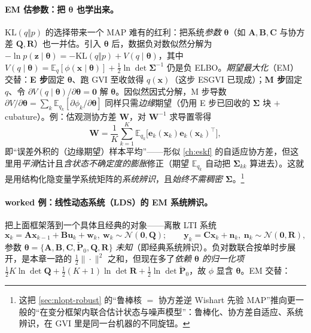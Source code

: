 \paragraph{EM 估参数：把 $\boldsymbol{\theta}$ 也学出来。}
$\mathrm{KL}(q\Vert p)$ 的选择带来一个 MAP 难有的红利：把系统\emph{参数} $\boldsymbol{\theta}$（如 $\mathbf{A},\mathbf{B},\mathbf{C}$ 与协方差 $\mathbf{Q},\mathbf{R}$）也一并估。引入 $\boldsymbol{\theta}$ 后，数据负对数似然分解为 $-\ln p(\mathbf{z}\mid\boldsymbol{\theta})=-\mathrm{KL}(q\Vert p)+V(q\mid\boldsymbol{\theta})$，其中 $V(q\mid\boldsymbol{\theta})=\mathbb{E}_q[\phi(\mathbf{x}\mid\boldsymbol{\theta})]+\tfrac12\ln\det\boldsymbol{\Sigma}^{-1}$ 仍是负 ELBO。\emph{期望最大化}（EM）交替：\textbf{E 步}固定 $\boldsymbol{\theta}$、跑 GVI 至收敛得 $q(\mathbf{x})$（这步 ESGVI 已现成）；\textbf{M 步}固定 $q$、令 $\partial V(q\mid\boldsymbol{\theta})/\partial\boldsymbol{\theta}=\mathbf{0}$ 解 $\boldsymbol{\theta}$。因似然因式分解，M 步导数 $\partial V/\partial\boldsymbol{\theta}=\sum_k\mathbb{E}_{q_k}[\partial\phi_k/\partial\boldsymbol{\theta}]$ 同样只需\emph{边缘}期望（仍用 E 步已回收的 $\boldsymbol{\Sigma}$ 块 $+$ cubature）。例：估观测协方差 $\mathbf{W}$，对 $\mathbf{W}^{-1}$ 求导置零得
\begin{equation}
  \mathbf{W}=\frac1K\sum_{k=1}^{K}\mathbb{E}_{q_k}\!\big[\mathbf{e}_k(\mathbf{x}_k)\mathbf{e}_k(\mathbf{x}_k)^\top\big],
  \label{eq:gvi-em-W}
\end{equation}
即“误差外积的（边缘期望）样本平均”——形似 \cref{ch:eskf} 的自适应协方差，但这里用\emph{平滑}估计且\emph{含状态不确定度的膨胀}修正（期望 $\mathbb{E}_{q_k}$ 自动把 $\boldsymbol{\Sigma}_{kk}$ 算进去）。这就是用结构化隐变量学系统矩阵的\emph{系统辨识}，且\emph{始终不需稠密 $\boldsymbol{\Sigma}$}。\footnote{这把 \cref{sec:nlopt-robust} 的“鲁棒核 $=$ 协方差逆 Wishart 先验 MAP”推向更一般的“在变分框架内联合估计状态与噪声模型”：鲁棒化、协方差自适应、系统辨识，在 GVI 里是同一台机器的不同旋钮。}

\paragraph{worked 例：线性动态系统（LDS）的 EM 系统辨识。}\cite{barfoot2024state}
把上面框架落到一个具体且经典的对象——离散 LTI 系统
\begin{equation}
  \mathbf{x}_k=\mathbf{A}\mathbf{x}_{k-1}+\mathbf{B}\mathbf{u}_k+\mathbf{w}_k,\ \mathbf{w}_k\sim\mathcal{N}(\mathbf{0},\mathbf{Q});\qquad
  \mathbf{y}_k=\mathbf{C}\mathbf{x}_k+\mathbf{n}_k,\ \mathbf{n}_k\sim\mathcal{N}(\mathbf{0},\mathbf{R}),
  \label{eq:gvi-lds-model}
\end{equation}
参数 $\boldsymbol{\theta}=\{\mathbf{A},\mathbf{B},\mathbf{C},\check{\mathbf{P}}_0,\mathbf{Q},\mathbf{R}\}$ \emph{未知}（即经典系统辨识）。负对数联合按单时步展开，是本章一路的 $\tfrac12\|\cdot\|^2$ 之和，但现在多了\emph{依赖 $\boldsymbol{\theta}$ 的归一化项} $\tfrac12 K\ln\det\mathbf{Q}+\tfrac12(K{+}1)\ln\det\mathbf{R}+\tfrac12\ln\det\check{\mathbf{P}}_0$，故 $\phi$ 显含 $\boldsymbol{\theta}$。EM 交替：

